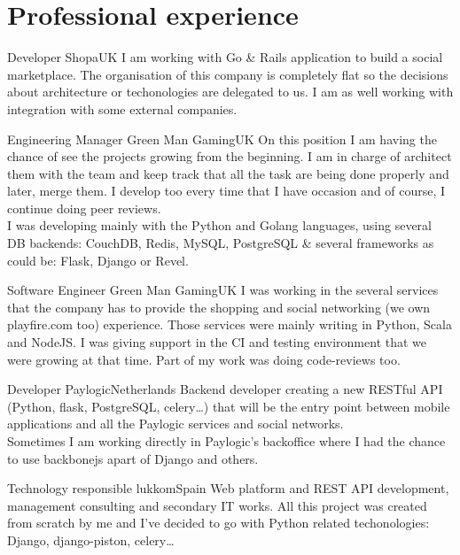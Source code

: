\documentclass[10pt, a4paper]{moderncv}
\begin{document}
\maketitle


%
%

\section{Professional experience}
{Developer}
{Shopa}{UK}{}
{I am working with Go \& Rails application to build a social marketplace. The
organisation of this company is completely flat so the decisions about
architecture or techonologies are delegated to us. I am as well working with
integration with some external companies.}

{Engineering Manager}
{Green Man Gaming}{UK}{}
{On this position I am having the chance of see the projects growing from the
beginning. I am in charge of architect them with the team and keep track that
all the task are being done properly and later, merge them. I develop too every
time that I have occasion and of course, I continue doing peer reviews.\\I was
developing mainly with the Python and Golang languages, using several DB
backends: CouchDB, Redis, MySQL, PostgreSQL \& several frameworks as could be:
Flask, Django or Revel.}

{Software Engineer}
{Green Man Gaming}{UK}{}
{I was working in the several services that the company has to provide the
shopping and social networking (we own playfire.com too) experience. Those
services were mainly writing in Python, Scala and NodeJS. I was giving support
in the CI and testing environment that we were growing at that time. Part of my
work was doing code-reviews too.}

{Developer}
{Paylogic}{Netherlands}{}
{Backend developer creating a new RESTful API (Python, flask, PostgreSQL,
celery\ldots) that will be the entry point between mobile applications and all
the Paylogic services and social networks.\\Sometimes I am working directly in
Paylogic's backoffice where I had the chance to use backbonejs apart of Django
and others.}

{Technology responsible}
{lukkom}{Spain}{}
{Web platform and REST API development, management consulting and secondary IT
works. All this project was created from scratch by me and I've decided to go
with Python related techonologies: Django, django-piston, celery\ldots}
\end{document}

